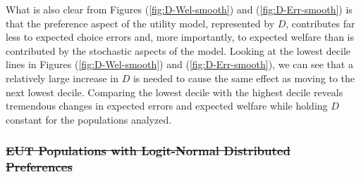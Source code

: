 \documentclass[11pt,a4paper]{report}
\providecommand{\DIFdeltex}[1]{{\protect\color{red}\sout{#1}}}                      %
\providecommand{\DIFdelbegin}{} %
\providecommand{\DIFdelend}{} %
\providecommand{\DIFdel}[1]{\texorpdfstring{\DIFdeltex{#1}}{}} %
\newcommand{\DIFscaledelfig}{0.5}
\newlength{\DIFdelgraphicswidth} %
\newlength{\DIFdelgraphicsheight} %
\newcommand{\DIFdelincludegraphics}[2][]{%
\sbox{\DIFdelgraphicsbox}{\DIFOincludegraphics[#1]{#2}}%
\settoboxwidth{\DIFdelgraphicswidth}{\DIFdelgraphicsbox} %
\settoboxtotalheight{\DIFdelgraphicsheight}{\DIFdelgraphicsbox} %
\scalebox{\DIFscaledelfig}{%
\parbox[b]{\DIFdelgraphicswidth}{\usebox{\DIFdelgraphicsbox}\\[-\baselineskip] \rule{\DIFdelgraphicswidth}{0em}}\llap{\resizebox{\DIFdelgraphicswidth}{\DIFdelgraphicsheight}{%
\setlength{\unitlength}{\DIFdelgraphicswidth}%
\begin{picture}(1,1)%
\thicklines\linethickness{2pt} %
{\color[rgb]{1,0,0}\put(0,0){\framebox(1,1){}}}%
{\color[rgb]{1,0,0}\put(0,0){\line( 1,1){1}}}%
{\color[rgb]{1,0,0}\put(0,1){\line(1,-1){1}}}%
\end{picture}%
}\hspace*{3pt}}} %
} %
\DeclareRobustCommand{\DIFdelbegin}{\DIFOdelbegin \let\includegraphics\DIFdelincludegraphics} %
\DeclareRobustCommand{\DIFdelend}{\DIFOaddend \let\includegraphics\DIFOincludegraphics} %
\begin{document}
What is also clear from Figures (\ref{fig:D-Wel-smooth}) and (\ref{fig:D-Err-smooth}) is that the preference aspect of the utility model, represented by $D$, contributes far less to expected choice errors and, more importantly, to expected welfare than is contributed by the stochastic aspects of the model.
Looking at the lowest decile lines in Figures (\ref{fig:D-Wel-smooth}) and (\ref{fig:D-Err-smooth}), we can see that a relatively large increase in $D$ is needed to cause the same effect as moving to the next lowest decile.
Comparing the lowest decile with the highest decile reveals tremendous changes in expected errors and expected welfare while holding $D$ constant for the populations analyzed.

\DIFdelbegin \subsubsection{\DIFdel{EUT Populations with Logit-Normal Distributed Preferences}}
\addtocounter{subsubsection}{-1}%
\DIFdelend %
\end{document}
